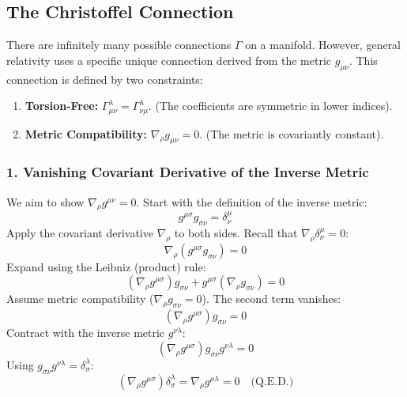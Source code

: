 \documentclass[11pt, a4paper]{report}
\begin{document}
\subsection*{The Christoffel Connection}
There are infinitely many possible connections \(\Gamma\) on a manifold. However, general relativity uses a specific unique connection derived from the metric \(g_{\mu\nu}\). This connection is defined by two constraints:
\begin{enumerate}
    \item \textbf{Torsion-Free:} \(\Gamma^\lambda_{\mu\nu} = \Gamma^\lambda_{\nu\mu}\). (The coefficients are symmetric in lower indices).
    \item \textbf{Metric Compatibility:} \(\nabla_\rho g_{\mu\nu} = 0\). (The metric is covariantly constant).
\end{enumerate}

\subsubsection*{1. Vanishing Covariant Derivative of the Inverse Metric}
We aim to show $\nabla_\rho g^{\mu\nu} = 0$.
Start with the definition of the inverse metric:
\begin{equation}
    g^{\mu\sigma} g_{\sigma\nu} = \delta^\mu_\nu
\end{equation}
Apply the covariant derivative $\nabla_\rho$ to both sides. Recall that $\nabla_\rho \delta^\mu_\nu = 0$:
\begin{equation}
    \nabla_\rho (g^{\mu\sigma} g_{\sigma\nu}) = 0
\end{equation}
Expand using the Leibniz (product) rule:
\begin{equation}
    (\nabla_\rho g^{\mu\sigma}) g_{\sigma\nu} + g^{\mu\sigma} (\nabla_\rho g_{\sigma\nu}) = 0
\end{equation}
Assume metric compatibility ($\nabla_\rho g_{\sigma\nu} = 0$). The second term vanishes:
\begin{equation}
    (\nabla_\rho g^{\mu\sigma}) g_{\sigma\nu} = 0
\end{equation}
Contract with the inverse metric $g^{\nu\lambda}$:
\begin{equation}
    (\nabla_\rho g^{\mu\sigma}) g_{\sigma\nu} g^{\nu\lambda} = 0
\end{equation}
Using $g_{\sigma\nu} g^{\nu\lambda} = \delta^\lambda_\sigma$:
\begin{equation}
    (\nabla_\rho g^{\mu\sigma}) \delta^\lambda_\sigma = \nabla_\rho g^{\mu\lambda} = 0 \quad \text{(Q.E.D.)}
\end{equation}
\end{document}
